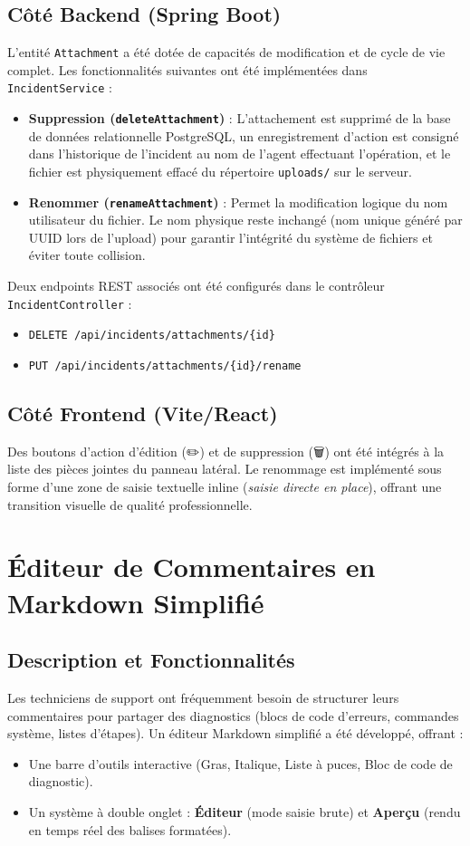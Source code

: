 \documentclass[12pt,a4paper]{article}
\begin{document}
\subsection{Côté Backend (Spring Boot)}
L'entité \texttt{Attachment} a été dotée de capacités de modification et de cycle de vie complet. Les fonctionnalités suivantes ont été implémentées dans \texttt{IncidentService} :
\begin{itemize}
    \item \textbf{Suppression (\texttt{deleteAttachment})} : L'attachement est supprimé de la base de données relationnelle PostgreSQL, un enregistrement d'action est consigné dans l'historique de l'incident au nom de l'agent effectuant l'opération, et le fichier est physiquement effacé du répertoire \texttt{uploads/} sur le serveur.
    \item \textbf{Renommer (\texttt{renameAttachment})} : Permet la modification logique du nom utilisateur du fichier. Le nom physique reste inchangé (nom unique généré par UUID lors de l'upload) pour garantir l'intégrité du système de fichiers et éviter toute collision.
\end{itemize}
Deux endpoints REST associés ont été configurés dans le contrôleur \texttt{IncidentController} :
\begin{itemize}
    \item \texttt{DELETE /api/incidents/attachments/\{id\}}
    \item \texttt{PUT /api/incidents/attachments/\{id\}/rename}
\end{itemize}

\subsection{Côté Frontend (Vite/React)}
Des boutons d'action d'édition (✏️) et de suppression (🗑️) ont été intégrés à la liste des pièces jointes du panneau latéral. Le renommage est implémenté sous forme d'une zone de saisie textuelle inline (\textit{saisie directe en place}), offrant une transition visuelle de qualité professionnelle.

\section{Éditeur de Commentaires en Markdown Simplifié}
\subsection{Description et Fonctionnalités}
Les techniciens de support ont fréquemment besoin de structurer leurs commentaires pour partager des diagnostics (blocs de code d'erreurs, commandes système, listes d'étapes). Un éditeur Markdown simplifié a été développé, offrant :
\begin{itemize}
    \item Une barre d'outils interactive (Gras, Italique, Liste à puces, Bloc de code de diagnostic).
    \item Un système à double onglet : \textbf{Éditeur} (mode saisie brute) et \textbf{Aperçu} (rendu en temps réel des balises formatées).
\end{itemize}
\end{document}
